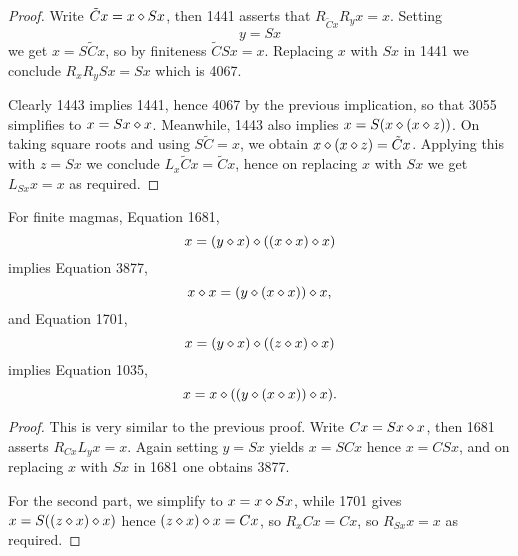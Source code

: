 \begin{proof}\leanok
  Write $\tilde C x = x \diamond Sx$, then 1441 asserts that $R_{\tilde Cx} R_y x = x$.  Setting $$y=Sx$$ we get $x = S\tilde Cx$, so by finiteness $\tilde C Sx = x$.  Replacing $x$ with $Sx$ in 1441 we conclude $R_x R_y Sx = Sx$ which is 4067.

  Clearly 1443 implies 1441, hence 4067 by the previous implication, so that 3055 simplifies to $x = Sx \diamond x$.  Meanwhile, 1443 also implies $x = S(x \diamond (x \diamond z))$.  On taking square roots and using $S \tilde C = x$, we obtain $x \diamond (x \diamond z) = \tilde Cx$.  Applying this with $z = Sx$ we conclude $L_x \tilde Cx = \tilde Cx$, hence on replacing $x$ with $Sx$ we get $L_{Sx} x = x$ as required.
\end{proof}

\begin{proposition}\label{1681-3877-1701-1035}\leanok{}
  For finite magmas, Equation 1681,
$$ x = (y \diamond x) \diamond ((x \diamond x) \diamond x)$$
implies Equation 3877,
$$ x \diamond x = (y \diamond (x \diamond x)) \diamond x,$$
and Equation 1701,
$$ x = (y \diamond x) \diamond ((z \diamond x) \diamond x)$$
implies Equation 1035,
$$ x = x \diamond ((y \diamond (x \diamond x)) \diamond x).$$
\end{proposition}

\begin{proof}\leanok This is very similar to the previous proof.
  Write $Cx = Sx \diamond x$, then 1681 asserts $R_{Cx} L_y x = x$.  Again setting $y=Sx$ yields $x=SCx$ hence $x = CSx$, and on replacing $x$ with $Sx$ in 1681 one obtains 3877.

For the second part, we simplify to $x = x \diamond Sx$, while 1701 gives $x = S((z \diamond x) \diamond x)$ hence $(z \diamond x) \diamond x = Cx$, so $R_x Cx = Cx$, so $R_{Sx} x = x$ as required.
\end{proof}
